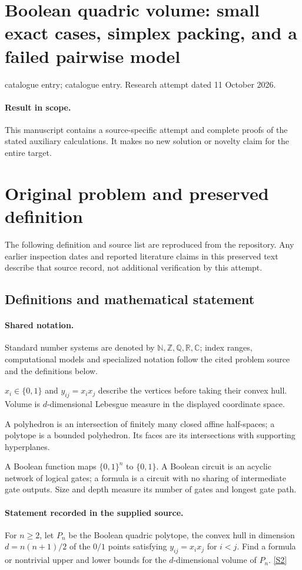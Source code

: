 \documentclass[11pt]{article}
\begin{document}
\section*{Boolean quadric volume: small exact cases, simplex packing, and a failed pairwise model}
\noindent catalogue entry; catalogue entry. Research attempt dated 11 October 2026.
\paragraph{Result in scope.}This manuscript contains a source-specific attempt and complete proofs of the stated auxiliary calculations. It makes no new solution or novelty claim for the entire target.
\section{Original problem and preserved definition}
The following definition and source list are reproduced from the repository. Any earlier inspection dates and reported literature claims in this preserved text describe that source record, not additional verification by this attempt.
\subsection{Definitions and mathematical statement}

\paragraph{Shared notation.}Standard number systems are denoted by $\mathbb N,\mathbb Z,\mathbb Q,\mathbb R,\mathbb C$; index ranges, computational models and specialized notation follow the cited problem source and the definitions below.


$x_i\in\{0,1\}$ and $y_{ij}=x_ix_j$ describe the vertices before taking their convex hull. Volume is $d$-dimensional Lebesgue measure in the displayed coordinate space.

A polyhedron is an intersection of finitely many closed affine half-spaces; a polytope is a bounded polyhedron. Its faces are its intersections with supporting hyperplanes.

A Boolean function maps $\{0,1\}^n$ to $\{0,1\}$. A Boolean circuit is an acyclic network of logical gates; a formula is a circuit with no sharing of intermediate gate outputs. Size and depth measure its number of gates and longest gate path.
\paragraph{Statement recorded in the supplied source.}
For $n\geq2$, let $P_n$ be the Boolean quadric polytope, the convex hull in dimension $d=n(n+1)/2$ of the $0/1$ points satisfying $y_{ij}=x_ix_j$ for $i<j$. Find a formula or nontrivial upper and lower bounds for the $d$-dimensional volume of $P_n$. \href{https://doi.org/10.4171/owr/2015/46}{[S2]}
\end{document}
